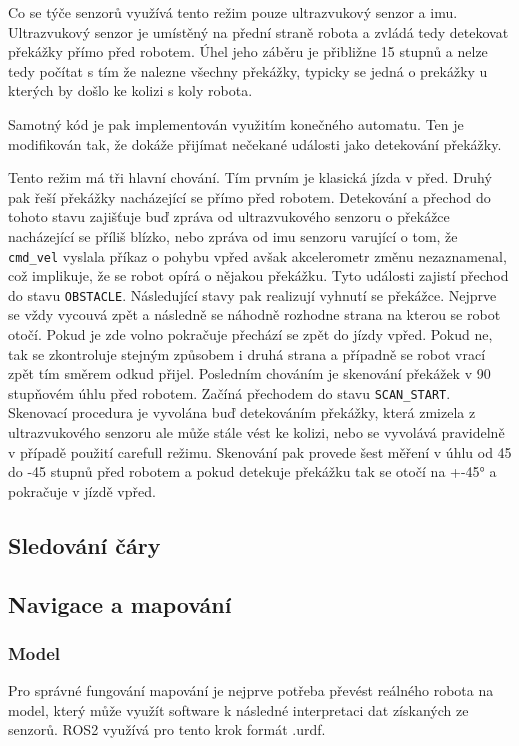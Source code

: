 Co se týče senzorů využívá tento režim pouze ultrazvukový senzor a imu. Ultrazvukový senzor je umístěný na přední straně robota a zvládá tedy detekovat překážky přímo před robotem. Úhel jeho záběru je přibližne 15 stupnů a nelze tedy počítat s tím že nalezne všechny překážky, typicky se jedná o prekážky u kterých by došlo ke kolizi s koly robota. 

Samotný kód je pak implementován využitím konečného automatu. Ten je modifikován tak, že dokáže přijímat nečekané události jako detekování překážky. 

Tento režim má tři hlavní chování. Tím prvním je klasická jízda v před. 
Druhý pak řeší překážky nacházející se přímo před robotem. Detekování a přechod do tohoto stavu zajišťuje buď zpráva od ultrazvukového senzoru o překážce nacházející se příliš blízko, nebo zpráva od imu senzoru varující o tom, že \verb|cmd_vel| vyslala příkaz o pohybu vpřed avšak akcelerometr změnu nezaznamenal, což implikuje, že se robot opírá o nějakou překážku. Tyto události zajistí přechod do stavu \verb|OBSTACLE|. Následující stavy pak realizují vyhnutí se překážce. Nejprve se vždy vycouvá zpět a následně se náhodně rozhodne strana na kterou se robot otočí. Pokud je zde volno pokračuje přechází se zpět do jízdy vpřed. Pokud ne, tak se zkontroluje stejným způsobem i druhá strana a případně se robot vrací zpět tím směrem odkud přijel.
Posledním chováním je skenování překážek v 90 stupňovém úhlu před robotem. Začíná přechodem do stavu \verb|SCAN_START|. Skenovací procedura je vyvolána buď detekováním překážky, která zmizela z ultrazvukového senzoru ale může stále vést ke kolizi, nebo se vyvolává pravidelně v případě použití carefull režimu. Skenování pak provede šest měření v úhlu od 45 do -45 stupnů před robotem a pokud detekuje překážku tak se otočí na +-45° a pokračuje v jízdě vpřed.


\subsection*{Sledování čáry}

\subsection*{Navigace a mapování}

\subsubsection*{Model}
Pro správné fungování mapování je nejprve potřeba převést reálného robota na model, který může využít software k následné interpretaci dat získaných ze senzorů. ROS2 využívá pro tento krok formát .urdf.

